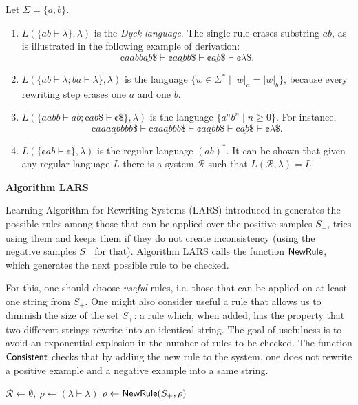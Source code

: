 \begin{example}
Let $\Sigma = \{a, b\}$. 
\begin{enumerate}
\item $L(\{ab \vdash \lambda\}, \lambda)$ is the \emph{Dyck language}. The single rule erases substring $ab$, as is illustrated in the following example of derivation:
$$\cent aabb \underline{ab} \$ \vdash
\cent a \underline{ab} b \$ \vdash
\cent \underline{ab} \$ \vdash
\cent \lambda \$.$$
\item $L(\{ab \vdash \lambda; ba \vdash \lambda\}, \lambda)$ is the language $\{w \in \Sigma^* \mid |w|_a = |w|_b\}$, because every rewriting step erases one $a$ and one $b$.
\item $L(\{aabb \vdash ab; \cent ab \$ \vdash \cent \$\}, \lambda)$ is the language $\{a^n b^n \mid n \ge 0\}$. For instance, 
$$\cent aa \underline{aabb} bb \$ \vdash
\cent a \underline{aabb} b \$ \vdash
\cent \underline{aabb} \$ \vdash
\cent \underline{ab} \$ \vdash
\cent \lambda \$.$$
\item $L(\{\cent ab \vdash \cent \}, \lambda)$ is the regular language $(ab)^*$. It can be shown that given any regular language $L$ there is a system $\mathcal{R}$ such that $L(\mathcal{R}, \lambda) = L$.
\end{enumerate}
\end{example}

{\bf Algorithm LARS}\label{section:lars}

Learning Algorithm for Rewriting Systems (LARS) introduced in \cite{Eyraud2007} generates the possible rules among those that can be applied over the positive samples $S_+$, tries using them and keeps them if they do not create inconsistency (using the negative samples $S_-$ for that). Algorithm LARS calls the function $\NewRule$, which generates the next possible rule to be checked.

For this, one should choose \emph{useful} rules, i.e. those that can be applied on at least one string from $S_+$. One might also consider useful a rule that allows us to diminish the size of the set $S_+$: a rule which, when added, has the property that two different strings rewrite into an identical string. The goal of usefulness is to avoid an exponential explosion in the number of rules to be checked. The function $\Consistent$ checks that by adding the new rule to the system, one does not rewrite a positive example and a negative example into a same string.


\begin{algorithm}
\caption{Learning algorithm $\mathsf{LARS}(S_+, S_-)$}
\label{algorithm:lars}
\LinesNumbered
{}
$\mathcal{R} \gets \emptyset,\ \rho \gets (\lambda \vdash \lambda)$\;
{$\rho \gets \NewRule(S_+, \rho)$\;
}
\;
\end{algorithm}


